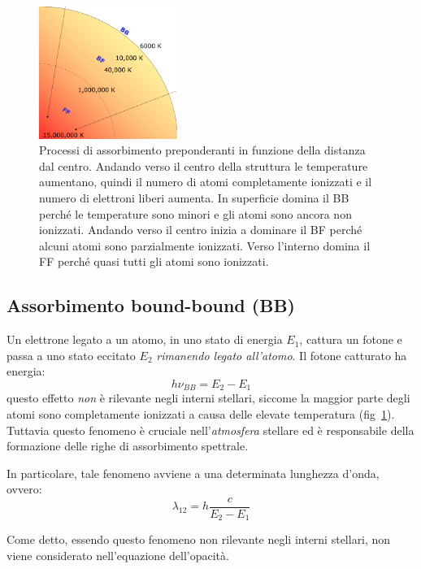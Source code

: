 \begin{figure}
\centering
\includegraphics[width=0.4\textwidth]{immagini/assorbimenti-stella.png}
\caption{Processi di assorbimento preponderanti in funzione della distanza dal centro. Andando verso il centro della struttura le temperature aumentano, quindi il numero di atomi completamente ionizzati e il numero di elettroni liberi aumenta. In superficie domina il BB perché le temperature sono minori e gli atomi sono ancora non ionizzati. Andando verso il centro inizia a dominare il BF perché alcuni atomi sono parzialmente ionizzati. Verso l'interno domina il FF perché quasi tutti gli atomi sono ionizzati.}
\label{fig:assorbimenti-stella}
\end{figure}

\subsection{Assorbimento bound-bound (BB)}\label{sec:bound-bound}
Un elettrone legato a un atomo, in uno stato di energia $E_1$, cattura un fotone e passa a uno stato eccitato $E_2$ \emph{rimanendo legato all'atomo}. Il fotone catturato ha energia:
\begin{equation}
    h \nu_{BB} = E_2 - E_1
\end{equation}
questo effetto \emph{non} è rilevante negli interni stellari, siccome la maggior parte degli atomi sono completamente ionizzati a causa delle elevate temperatura (fig~\ref{fig:assorbimenti-stella}). Tuttavia questo fenomeno è cruciale nell'\emph{atmosfera} stellare ed è responsabile della formazione delle righe di assorbimento spettrale.

In particolare, tale fenomeno avviene a una determinata lunghezza d'onda, ovvero:
\begin{equation}\label{eq:lunghezza-BB}
    \lambda_{12} = h \dfrac{c}{E_2 - E_1}
\end{equation}

Come detto, essendo questo fenomeno non rilevante negli interni stellari, non viene considerato nell'equazione dell'opacità.


